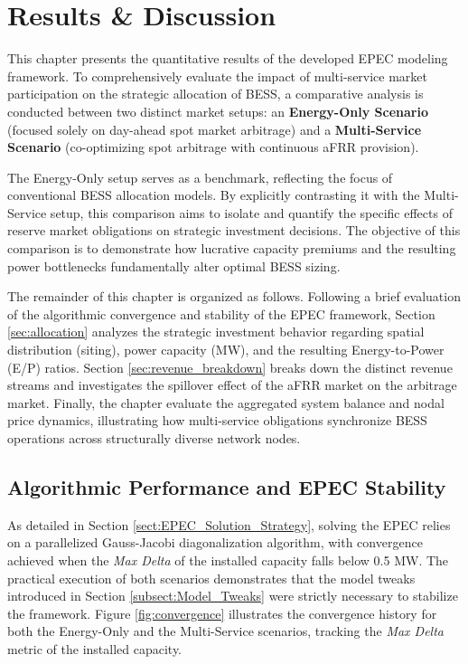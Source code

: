 \chapter{Results \& Discussion} \label{ch:results}

This chapter presents the quantitative results of the developed EPEC modeling framework. To comprehensively evaluate the impact of multi-service market participation on the strategic allocation of BESS, a comparative analysis is conducted between two distinct market setups: an \textbf{Energy-Only Scenario} (focused solely on day-ahead spot market arbitrage) and a \textbf{Multi-Service Scenario} (co-optimizing spot arbitrage with continuous aFRR provision). 

The Energy-Only setup serves as a benchmark, reflecting the focus of conventional BESS allocation models. By explicitly contrasting it with the Multi-Service setup, this comparison aims to isolate and quantify the specific effects of reserve market obligations on strategic investment decisions. The objective of this comparison is to demonstrate how lucrative capacity premiums and the resulting power bottlenecks fundamentally alter optimal BESS sizing.

The remainder of this chapter is organized as follows. Following a brief evaluation of the algorithmic convergence and stability of the EPEC framework, Section \ref{sec:allocation} analyzes the strategic investment behavior regarding spatial distribution (siting), power capacity (MW), and the resulting Energy-to-Power (E/P) ratios. Section \ref{sec:revenue_breakdown} breaks down the distinct revenue streams and investigates the spillover effect of the aFRR market on the arbitrage market. Finally, the chapter evaluate the aggregated system balance and nodal price dynamics, illustrating how multi-service obligations synchronize BESS operations across structurally diverse network nodes.

\section{Algorithmic Performance and EPEC Stability}
As detailed in Section \ref{sect:EPEC_Solution_Strategy}, solving the EPEC relies on a parallelized Gauss-Jacobi diagonalization algorithm, with convergence achieved when the \textit{Max Delta} of the installed capacity falls below 0.5 MW. The practical execution of both scenarios demonstrates that the model tweaks introduced in Section \ref{subsect:Model_Tweaks} were strictly necessary to stabilize the framework. Figure \ref{fig:convergence} illustrates the convergence history for both the Energy-Only and the Multi-Service scenarios, tracking the \textit{Max Delta} metric of the installed capacity.


